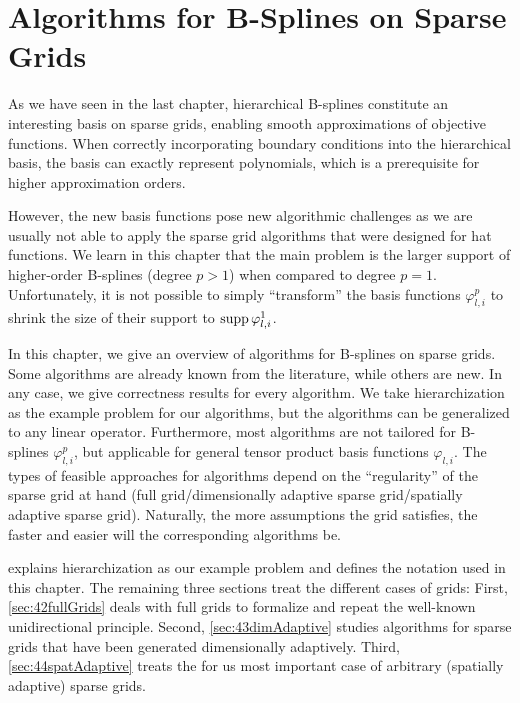 
\chapter{Algorithms for B-Splines on Sparse Grids}



As we have seen in the last chapter,
hierarchical B-splines constitute an interesting basis on sparse grids,
enabling smooth approximations of objective functions.
When correctly incorporating boundary conditions into the hierarchical basis,
the basis can exactly represent polynomials,
which is a prerequisite for higher approximation orders.

However, the new basis functions pose new algorithmic challenges
as we are usually not able to apply the sparse grid algorithms
that were designed for hat functions.
We learn in this chapter that the main problem is the larger support
of higher-order B-splines (degree $p > 1$) when compared to degree $p = 1$.
Unfortunately, it is not possible to simply ``transform'' the basis
functions $\varphi_{l,i}^p$ to shrink the size of their support
to $\operatorname{supp} \varphi_{l,i}^1$.

In this chapter, we give an overview of algorithms for B-splines
on sparse grids.
Some algorithms are already known from the literature,
while others are new.
In any case, we give correctness results for every algorithm.
We take hierarchization as the example problem for our algorithms,
but the algorithms can be generalized to any linear operator.
Furthermore, most algorithms are not tailored for B-splines $\varphi_{l,i}^p$,
but applicable for general tensor product basis functions $\varphi_{l,i}$.
The types of feasible approaches for algorithms
depend on the ``regularity'' of the sparse grid at hand
(full grid/dimensionally adaptive sparse grid/spatially adaptive sparse grid).
Naturally, the more assumptions the grid satisfies, the faster and
easier will the corresponding algorithms be.

 explains hierarchization as our example problem
and defines the notation used in this chapter.
The remaining three sections treat the different cases of grids:
First, \cref{sec:42fullGrids} deals with full grids to formalize and repeat
the well-known unidirectional principle.
Second, \cref{sec:43dimAdaptive} studies algorithms for
sparse grids that have been generated dimensionally adaptively.
Third, \cref{sec:44spatAdaptive} treats the for us most important case
of arbitrary (spatially adaptive) sparse grids.








\cleardoublepage
